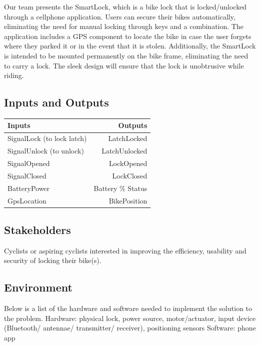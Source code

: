 \documentclass{article}
\begin{document}
Our team presents the SmartLock, which is a bike lock that is locked/unlocked through a cellphone application.  Users can secure their bikes automatically, eliminating the need for manual locking through keys and a combination.  The application includes a GPS component to locate the bike in case the user forgets where they parked it or in the event that it is stolen.  Additionally, the SmartLock is intended to be mounted permanently on the bike frame, eliminating the need to carry a lock.  The sleek design will ensure that the lock is unobtrusive while riding. 


\subsection{Inputs and Outputs}

\begin{table}[hp]
  \begin{center}
    \begin{tabular}{| l | r |}
    \hline
      \textbf{Inputs} & \textbf{Outputs}\\
      \hline
      SignalLock (to lock latch)  & LatchLocked\\
	    SignalUnlock (to unlock) & LatchUnlocked\\
	    SignalOpened & LockOpened\\
	    SignalClosed & LockClosed\\
	    BatteryPower & Battery \% Status\\
	    GpsLocation & BikePosition\\
	    \hline
    \end{tabular}
  \end{center}
\end{table}

\subsection{Stakeholders}

Cyclists or aspiring cyclists interested in improving the efficiency, usability and security of locking their bike(s).

\subsection{Environment}

Below is a list of the hardware and software needed to implement the solution to the problem.
Hardware: physical lock, power source, motor/actuator, input device (Bluetooth/ antennae/ transmitter/ receiver), positioning sensors 
Software: phone app
\end{document}
